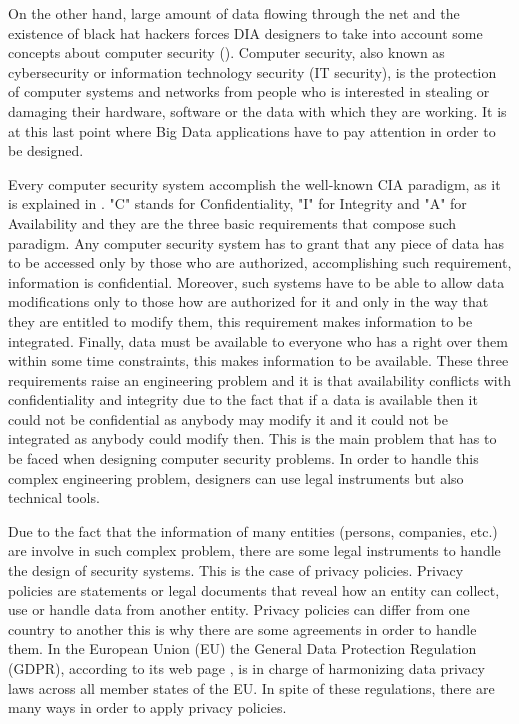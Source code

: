 On the other hand, large amount of data flowing through the net and the existence of black hat hackers forces DIA designers to take into account some concepts about computer security (\cite{computersecurityslides}). Computer security, also known as cybersecurity or information technology security (IT security), is the protection of computer systems and networks from people who is interested in stealing or damaging their hardware, software or the data with which they are working. It is at this last point where Big Data applications have to pay attention in order to be designed.

Every computer security system accomplish the well-known CIA paradigm, as it is explained in \cite{computersecurityslides}. "C" stands for Confidentiality, "I" for Integrity and "A" for Availability and they are the three basic requirements that compose such paradigm. Any computer security system has to grant that any piece of data has to be accessed only by those who are authorized, accomplishing such requirement, information is confidential. Moreover, such systems have to be able to allow data modifications only to those how are authorized for it and only in the way that they are entitled to modify them, this requirement makes information to be integrated. Finally, data must be available to everyone who has a right over them within some time constraints, this makes information to be available. These three requirements raise an engineering problem and it is that availability conflicts with confidentiality and integrity due to the fact that if a data is available then it could not be confidential as anybody may modify it and it could not be integrated as anybody could modify then. This is the main problem that has to be faced when designing computer security problems. In order to handle this complex engineering problem, designers can use legal instruments but also technical tools.

Due to the fact that the information of many entities (persons, companies, etc.) are involve in such complex problem, there are some legal instruments to handle the design of security systems. This is the case of privacy policies. Privacy policies are statements or legal documents that reveal how an entity can collect, use or handle data from another entity. Privacy policies can differ from one country to another this is why there are some agreements in order to handle them. In the European Union (EU) the General Data Protection Regulation (GDPR), according to its web page \cite{gdprwebpage}, is in charge of harmonizing data privacy laws across all member states of the EU. In spite of these regulations, there are many ways in order to apply privacy policies.

